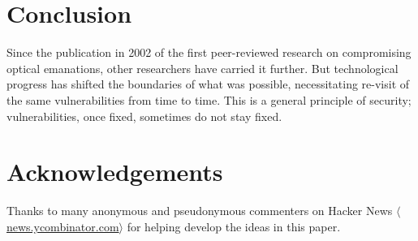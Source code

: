\documentclass[conference]{IEEEtran}
\newcommand{\URL}[1]{$\langle$\url{#1}$\rangle$}
\begin{document}

\section{Conclusion}

Since the publication in 2002 of the first peer-reviewed research on
compromising optical emanations, other researchers have carried it further.
But technological progress has shifted the boundaries of what was possible,
necessitating re-visit of the same vulnerabilities from time to time. This is
a general principle of security; vulnerabilities, once fixed, sometimes do
not stay fixed.

\section*{Acknowledgements}

Thanks to many anonymous and pseudonymous commenters on Hacker News
\URL{news.ycombinator.com} for helping develop the ideas in this paper.






\end{document}
